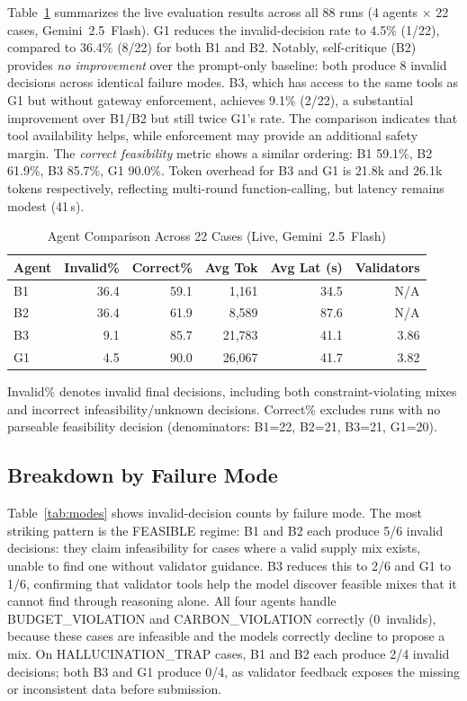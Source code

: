 \documentclass[conference]{IEEEtran}
\begin{document}
Table~\ref{tab:main} summarizes the live evaluation results across all
88 runs (4 agents $\times$ 22 cases, Gemini~2.5~Flash).
G1 reduces the invalid-decision rate to 4.5\% (1/22), compared to
36.4\% (8/22) for both B1 and B2.
Notably, self-critique (B2) provides \emph{no improvement} over the
prompt-only baseline: both produce 8 invalid decisions across
identical failure modes.  B3, which has access to the same tools as G1
but without gateway enforcement, achieves 9.1\% (2/22), a substantial
improvement over B1/B2 but still twice G1's rate.  The comparison indicates
that tool availability helps, while enforcement may provide an additional
safety margin.  The \emph{correct feasibility} metric shows a similar
ordering: B1 59.1\%, B2 61.9\%, B3 85.7\%, G1 90.0\%.  Token overhead
for B3 and G1 is 21.8k and 26.1k tokens respectively, reflecting
multi-round function-calling, but latency remains modest (41\,s).

\begin{table}[t]
\centering
\caption{Agent Comparison Across 22 Cases (Live, Gemini~2.5~Flash)}
\label{tab:main}
\begin{tabular}{lrrrrr}
\toprule
Agent & Invalid\% & Correct\% & Avg Tok & Avg Lat (s) & Validators \\
\midrule
B1    & 36.4   &  59.1     &  1{,}161  &  34.5     & N/A  \\
B2    & 36.4   &  61.9     &  8{,}589  &  87.6     & N/A  \\
B3    &  9.1   &  85.7     & 21{,}783  &  41.1     & 3.86 \\
G1    &  4.5   &  90.0     & 26{,}067  &  41.7     & 3.82 \\
\bottomrule
\end{tabular}
\vspace{0.5mm}
\footnotesize Invalid\% denotes invalid final decisions, including both
constraint-violating mixes and incorrect infeasibility/unknown decisions.
Correct\% excludes runs with no parseable feasibility decision
(denominators: B1=22, B2=21, B3=21, G1=20).
\end{table}

\subsection{Breakdown by Failure Mode}

Table~\ref{tab:modes} shows invalid-decision counts by failure mode.
The most striking pattern is the \textsc{FEASIBLE} regime: B1 and B2 each
produce 5/6 invalid decisions: they claim infeasibility for cases
where a valid supply mix exists, unable to find one without validator
guidance.  B3 reduces this to 2/6 and G1 to 1/6, confirming that
validator tools help the model discover feasible mixes that it cannot
find through reasoning alone.  All four agents handle
\textsc{BUDGET\_VIOLATION} and \textsc{CARBON\_VIOLATION} correctly
(0~invalids), because these cases are infeasible and the models
correctly decline to propose a mix.  On \textsc{HALLUCINATION\_TRAP}
cases, B1 and B2 each produce 2/4 invalid decisions; both B3 and
G1 produce 0/4, as validator feedback exposes the missing or
inconsistent data before submission.
\end{document}

